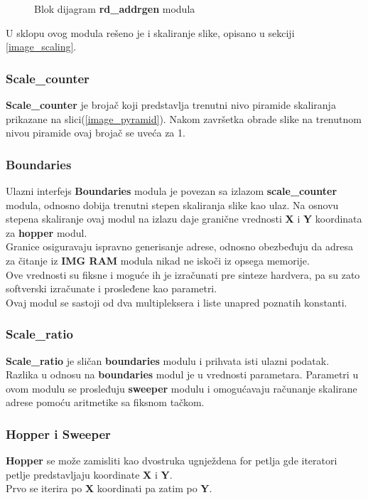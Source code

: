 \begin{figure}[H]
    
\caption{Blok dijagram \textbf{rd\_addrgen} modula}
\label{rd_addrgen_bd}
\end{figure}

U sklopu ovog modula rešeno je i skaliranje slike, opisano u sekciji \ref{image_scaling}.

\subsubsection{Scale\_counter}\label{scale_counter_sec}
\textbf{Scale\_counter} je brojač koji predstavlja trenutni nivo piramide
skaliranja prikazane na slici(\ref{image_pyramid}).
Nakom završetka obrade slike na trenutnom nivou piramide ovaj brojač se uveća za
1. \\

\subsubsection{Boundaries}\label{boundaries_sec}
Ulazni interfejs \textbf{Boundaries} modula je povezan sa izlazom
\textbf{scale\_counter} modula, odnosno dobija trenutni stepen skaliranja slike kao ulaz.
Na osnovu stepena skaliranje ovaj modul na izlazu daje granične vrednosti
\textbf{X} i \textbf{Y} koordinata za \textbf{hopper} modul.\\
Granice osiguravaju ispravno generisanje adrese, odnosno obezbeđuju da
adresa za čitanje iz \textbf{IMG RAM} modula nikad ne iskoči iz opsega memorije. \\
Ove vrednosti su fiksne i moguće ih je izračunati pre sinteze hardvera, pa su
zato softverski izračunate i prosleđene kao parametri. \\
Ovaj modul se sastoji od dva multipleksera i liste unapred poznatih konstanti.

\subsubsection{Scale\_ratio}\label{scale_ratio_sec}

\textbf{Scale\_ratio} je sličan \textbf{boundaries} modulu i prihvata isti
ulazni podatak. \\
Razlika u odnosu na \textbf{boundaries} modul je u vrednosti parametara.
Parametri u ovom modulu se prosleđuju \textbf{sweeper} modulu i omogućavaju
računanje skalirane adrese pomoću aritmetike sa fiksnom tačkom.

\subsubsection{Hopper i Sweeper}\label{hopper_sec}
\textbf{Hopper} se može zamisliti kao dvostruka ugnježdena for petlja gde
iteratori petlje predstavljaju koordinate \textbf{X} i \textbf{Y}. \\
Prvo se iterira po \textbf{X} koordinati pa zatim po \textbf{Y}.

